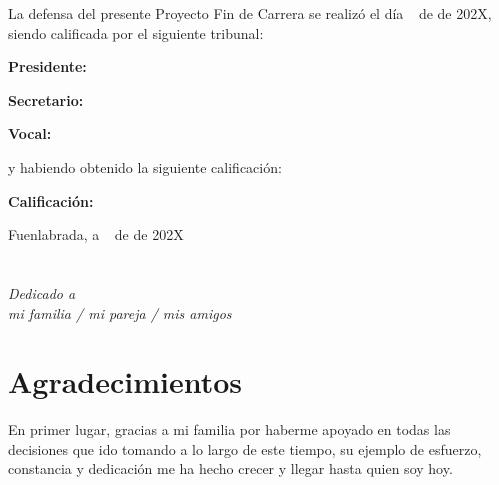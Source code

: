 \documentclass[a4paper, 12pt]{book}
\begin{document}
\vspace{1cm}
La defensa del presente Proyecto Fin de Carrera se realizó el día \qquad$\;\,$ de \qquad\qquad\qquad\qquad \newline de 202X, siendo calificada por el siguiente tribunal:


\vspace{0.5cm}
\textbf{Presidente:}

\vspace{1.2cm}
\textbf{Secretario:}

\vspace{1.2cm}
\textbf{Vocal:}


\vspace{1.2cm}
y habiendo obtenido la siguiente calificación:

\vspace{1cm}
\textbf{Calificación:}


\vspace{1cm}
\begin{flushright}
Fuenlabrada, a \qquad$\;\,$ de \qquad\qquad\qquad\qquad de 202X
\end{flushright}


\chapter*{}
\begin{flushright}
\textit{Dedicado a \\
mi familia / mi pareja / mis amigos}
\end{flushright}


\chapter*{Agradecimientos}

En primer lugar, gracias a mi familia por haberme apoyado en todas las decisiones que ido tomando a lo largo de este tiempo, su ejemplo de esfuerzo, constancia y dedicación me ha hecho crecer y llegar hasta quien soy hoy.
\end{document}
